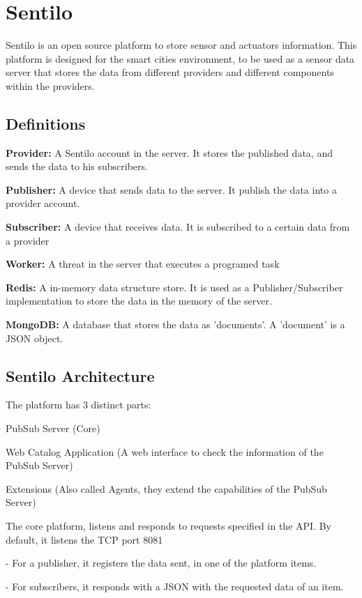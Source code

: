 \section{Sentilo}

Sentilo is an open source platform to store sensor and actuators information.
This platform is designed for the smart cities environment,
	to be used as a sensor data server that stores the data from different providers and different components within the providers.

\subsection{Definitions}

\textbf{Provider:} A Sentilo account in the server. It stores the published data, and
sends the data to his subscribers.

\textbf{Publisher:} A device that sends data to the server. It publish the data into a
provider account.

\textbf{Subscriber:} A device that receives data. It is subscribed to a certain data from a
provider

\textbf{Worker:} A threat in the server that executes a programed task

\textbf{Redis:} A in-memory data structure store. It is used as a Publisher/Subscriber
implementation to store the data in the memory of the server.

\textbf{MongoDB:} A database that stores the data as 'documents'. A 'document' is a
JSON object.


\subsection{Sentilo Architecture}

The platform has 3 distinct parts:

PubSub Server (Core)

Web Catalog Application (A web interface to check the information of the
PubSub Server)

Extensions (Also called Agents, they extend the capabilities of the PubSub
Server)

The core platform, listens and responds to requests specified in the API. By default,
it listens the TCP port 8081

- For a publisher, it registers the data sent, in one of the platform items.

- For subscribers, it responds with a JSON with the requested data of an item.

